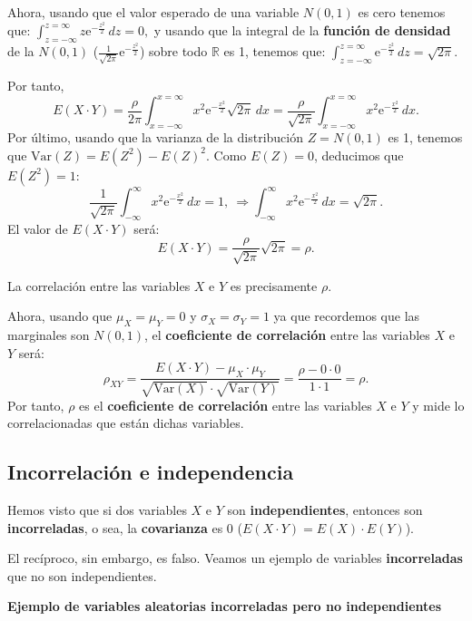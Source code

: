 \documentclass[]{book}
\begin{document}
Ahora, usando que el valor esperado de una variable \(N(0,1)\) es cero tenemos que:
\(\int_{z=-\infty}^{z=\infty} z \mathrm{e}^{-\frac{z^2}{2}}\, dz =0,\) y usando que la integral de la \textbf{función de densidad} de la \(N(0,1)\) (\(\frac{1}{\sqrt{2\pi}}\mathrm{e}^{-\frac{z^2}{2}}\)) sobre todo \(\mathbb{R}\) es 1, tenemos que:
\(\int_{z=-\infty}^{z=\infty} \mathrm{e}^{-\frac{z^2}{2}}\, dz =\sqrt{2\pi}.\)

Por tanto,
\[
E(X\cdot Y)=\frac{\rho}{2\pi} \int_{x=-\infty}^{x=\infty} x^2  \mathrm{e}^{-\frac{x^2}{2}}\sqrt{2\pi}\, dx=\frac{\rho}{\sqrt{2\pi}}\int_{x=-\infty}^{x=\infty} x^2  \mathrm{e}^{-\frac{x^2}{2}}\, dx.
\]
Por último, usando que la varianza de la distribución \(Z=N(0,1)\) es 1, tenemos que \(\mathrm{Var}(Z)=E\left(Z^2\right)-E(Z)^2\). Como \(E(Z)=0\), deducimos que \(E\left(Z^2\right)=1\):
\[
\frac{1}{\sqrt{2\pi}}\int_{-\infty}^\infty x^2\mathrm{e}^{-\frac{x^2}{2}}\, dx=1,\ \Rightarrow \int_{-\infty}^\infty x^2\mathrm{e}^{-\frac{x^2}{2}}\, dx=\sqrt{2\pi}.
\]
El valor de \(E(X\cdot Y)\) será:
\[
E(X\cdot Y)=\frac{\rho}{\sqrt{2\pi}}\sqrt{2\pi}=\rho.
\]

La correlación entre las variables \(X\) e \(Y\) es precisamente \(\rho\).

Ahora, usando que \(\mu_X=\mu_Y=0\) y \(\sigma_X=\sigma_Y=1\) ya que recordemos que las marginales son \(N(0,1)\), el \textbf{coeficiente de correlación} entre las variables \(X\) e \(Y\) será:
\[
\rho_{XY}=\frac{E(X\cdot Y)-\mu_X\cdot \mu_Y}{\sqrt{\mathrm{Var}(X)}\cdot\sqrt{\mathrm{Var}(Y)}}=\frac{\rho-0\cdot 0}{1\cdot 1}=\rho.
\]
Por tanto, \(\rho\) es el \textbf{coeficiente de correlación} entre las variables \(X\) e \(Y\) y mide lo correlacionadas que están dichas variables.

\hypertarget{incorrelaciuxf3n-e-independencia}{%
\subsection{Incorrelación e independencia}\label{incorrelaciuxf3n-e-independencia}}

Hemos visto que si dos variables \(X\) e \(Y\) son \textbf{independientes}, entonces son \textbf{incorreladas}, o sea, la \textbf{covarianza} es 0 (\(E(X\cdot Y)=E(X)\cdot E(Y)\)).

El recíproco, sin embargo, es falso. Veamos un ejemplo de variables \textbf{incorreladas} que no son independientes.

\textbf{Ejemplo de variables aleatorias incorreladas pero no independientes}
\end{document}
